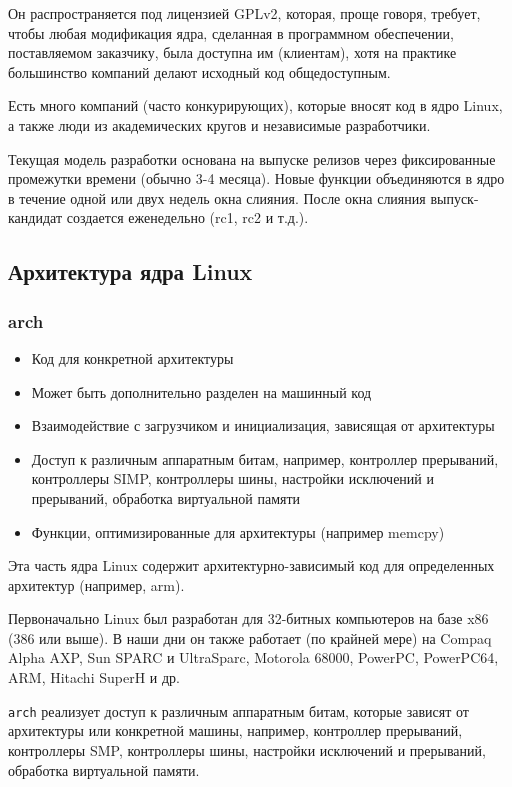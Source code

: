 \documentclass{article}
\begin{document}
    Он распространяется под лицензией GPLv2, которая, проще говоря, требует, 
    чтобы любая модификация ядра, сделанная в программном обеспечении, 
    поставляемом заказчику, была доступна им (клиентам), хотя на практике 
    большинство компаний делают исходный код общедоступным.

    Есть много компаний (часто конкурирующих), которые вносят код в ядро Linux, 
    а также люди из академических кругов и независимые разработчики.

    Текущая модель разработки основана на выпуске релизов через фиксированные 
    промежутки времени (обычно 3-4 месяца). Новые функции объединяются в ядро в 
    течение одной или двух недель окна слияния. После окна слияния 
    выпуск-кандидат создается еженедельно (rc1, rc2 и т.д.).

    \subsection{Архитектура ядра Linux}

    \subsubsection{arch}
    \begin{itemize}
        \item Код для конкретной архитектуры
        \item Может быть дополнительно разделен на машинный код
        \item Взаимодействие с загрузчиком и инициализация, зависящая от
        архитектуры
        \item Доступ к различным аппаратным битам, например, контроллер
        прерываний, контроллеры SIMP, контроллеры шины, настройки исключений
        и прерываний, обработка виртуальной памяти
        \item Функции, оптимизированные для архитектуры (например memcpy)
    \end{itemize}

    Эта часть ядра Linux содержит архитектурно-зависимый код для определенных
    архитектур (например, arm).

    Первоначально Linux был разработан для 32-битных компьютеров на базе x86
    (386 или выше). В наши дни он также работает (по крайней мере) на Compaq
    Alpha AXP, Sun SPARC и UltraSparc, Motorola 68000, PowerPC, PowerPC64,
    ARM, Hitachi SuperH и др.

    \texttt{arch} реализует доступ к различным аппаратным битам, которые
    зависят от архитектуры или конкретной машины, например, контроллер
    прерываний, контроллеры SMP, контроллеры шины, настройки исключений и
    прерываний, обработка виртуальной памяти.
\end{document}
